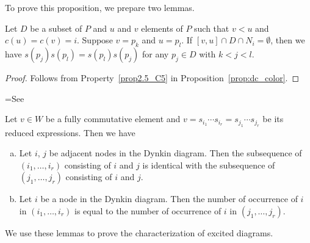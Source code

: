 \documentclass[ALCO,ThmDefs,Unicode,epreuves]{cedram}
\begin{document}
To prove this proposition, we prepare two lemmas.

\begin{lemm}
\label{lem:comm}
Let $D$ be a subset of $P$ and $u$ and $v$ elements of $P$ such that $v < u$ and $c(u) = c(v) = i$.
Suppose $v = p_k$ and $u = p_l$.
If $[v,u] \cap D \cap N_i = \emptyset$, 
then we have $s(p_j) s(p_l) = s(p_l) s(p_j)$ for any $p_j \in D$ with $k < j < l$. 
\end{lemm}

\begin{proof}
Follows from Property~\ref{prop2.5_C5} in Proposition~\ref{prop:dc_color}.
\end{proof}

\setbox\toto=\hbox{See~\cite[Section~3]{GK}}
\begin{lemm}[\box\toto]
\label{lem:fc}
Let $v \in W$ be a fully commutative element 
and $v = s_{i_1} \cdots s_{i_r} = s_{j_1} \cdots s_{j_r}$ be its reduced expressions.
Then we have
\begin{enumerate}[(a)]
\item\label{lemma3.6_a} %
Let $i$, $j$ be adjacent nodes in the Dynkin diagram.
Then the subsequence of $(i_1, \ldots, i_r)$ consisting of $i$ and $j$ 
is identical with the subsequence of $(j_1, \ldots, j_r)$ consisting of $i$ and $j$.
\item\label{lemma3.6_b} %
Let $i$ be a node in the Dynkin diagram.
Then the number of occurrence of $i$ in $(i_1, \ldots, i_r)$ 
is equal to the number of occurrence of $i$ in $(j_1, \ldots, j_r)$.
\end{enumerate}
\end{lemm}

We use these lemmas to prove the characterization of excited diagrams.
\end{document}
